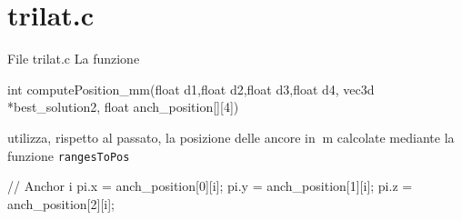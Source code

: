 \section{trilat.c}
\begin{frame}[fragile]{File trilat.c}
  La funzione
  \begin{C}
    int computePosition_mm(float d1,float d2,float d3,float d4, vec3d *best_solution2, float anch_position[][4])
  \end{C}
  utilizza, rispetto al passato, la posizione delle ancore in $\SI{}{\meter}$ calcolate mediante la funzione \lstinline[languace=C]!rangesToPos!
  \begin{C}
    // Anchor i
    pi.x = anch_position[0][i];
    pi.y = anch_position[1][i];
    pi.z = anch_position[2][i];
  \end{C}
\end{frame}
  

